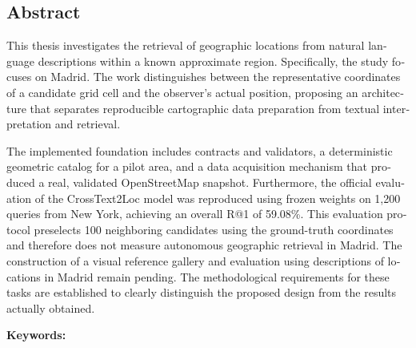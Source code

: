 \begin{otherlanguage}{english}
\section*{Abstract}
This thesis investigates the retrieval of geographic locations from natural language descriptions within a known approximate region. Specifically, the study focuses on Madrid. The work distinguishes between the representative coordinates of a candidate grid cell and the observer's actual position, proposing an architecture that separates reproducible cartographic data preparation from textual interpretation and retrieval.

The implemented foundation includes contracts and validators, a deterministic geometric catalog for a pilot area, and a data acquisition mechanism that produced a real, validated OpenStreetMap snapshot. Furthermore, the official evaluation of the CrossText2Loc model was reproduced using frozen weights on 1,200 queries from New York, achieving an overall R@1 of 59.08\%. This evaluation protocol preselects 100 neighboring candidates using the ground-truth coordinates and therefore does not measure autonomous geographic retrieval in Madrid. The construction of a visual reference gallery and evaluation using descriptions of locations in Madrid remain pending. The methodological requirements for these tasks are established to clearly distinguish the proposed design from the results actually obtained.

\noindent\textbf{Keywords:} \keywordsTFG
\end{otherlanguage}
\clearpage
